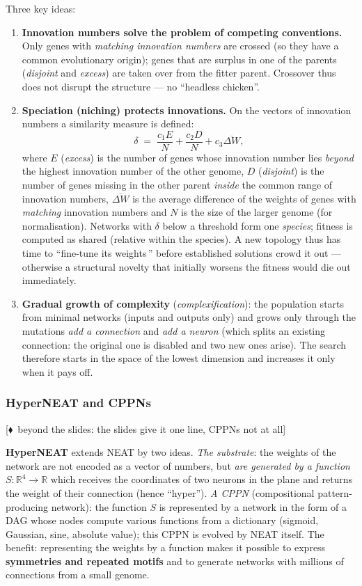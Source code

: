 \documentclass[11pt,a4paper]{article}
\theoremstyle{definition}
\providecommand{\uv}[1]{``#1''}
\newcommand{\mimoq}[1]{\textcolor{markcol}{\textsf{\footnotesize[$\blacklozenge$~beyond the slides: #1]}}}
\begin{document}
Three key ideas:
\begin{enumerate}
\item \textbf{Innovation numbers solve the problem of competing conventions.}
  Only genes with \emph{matching innovation numbers} are crossed (so they have a
  common evolutionary origin); genes that are surplus in one of the parents
  (\emph{disjoint} and \emph{excess}) are taken over from the fitter parent.
  Crossover thus does not disrupt the structure --- no \uv{headless chicken}.
\item \textbf{Speciation (niching) protects innovations.} On the vectors of
  innovation numbers a similarity measure is defined:
  \[
  \delta \;=\; \frac{c_1 E}{N} + \frac{c_2 D}{N} + c_3 \overline{\Delta W},
  \]
  where $E$ (\emph{excess}) is the number of genes whose innovation number lies
  \emph{beyond} the highest innovation number of the other genome, $D$
  (\emph{disjoint}) is the number of genes missing in the other parent
  \emph{inside} the common range of innovation numbers, $\overline{\Delta W}$ is
  the average difference of the weights of genes with \emph{matching} innovation
  numbers and $N$ is the size of the larger genome (for normalisation). Networks
  with $\delta$ below a threshold form one \emph{species};
  fitness is computed as shared (relative within the species). A new topology
  thus has time to \uv{fine-tune its weights\,} before established solutions
  crowd it out --- otherwise a structural novelty that initially worsens the
  fitness would die out immediately.
\item \textbf{Gradual growth of complexity} (\emph{complexification}): the
  population starts from minimal networks (inputs and outputs only) and grows
  only through the mutations \emph{add a connection} and \emph{add a neuron}
  (which splits an existing connection: the original one is disabled and two new
  ones arise). The search therefore starts in the space of the lowest dimension
  and increases it only when it pays off.
\end{enumerate}

\subsubsection{HyperNEAT and CPPNs}

\noindent\mimoq{the slides give it one line, CPPNs not at all}

\textbf{HyperNEAT} extends NEAT by two ideas. \emph{The substrate}: the weights of the
network are not encoded as a vector of numbers, but \emph{are generated by a function}
$S : \mathbb{R}^4 \to \mathbb{R}$ which receives the coordinates of two neurons in the plane
and returns the weight of their connection (hence \uv{hyper}). \emph{A CPPN}
(compositional pattern-producing network): the function $S$ is represented by a network in
the form of a DAG whose nodes compute various functions from a dictionary (sigmoid, Gaussian,
sine, absolute value); this CPPN is evolved by NEAT itself. The benefit: representing the
weights by a function makes it possible to express \textbf{symmetries and repeated motifs}
and to generate networks with millions of connections from a small genome.
\end{document}
